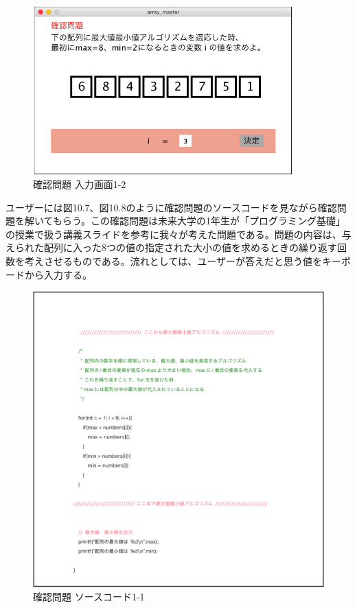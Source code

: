 \documentclass[openany,11pt,papersize]{jsbook}
\begin{document}
\begin{figure}[H]
\begin{center}
\includegraphics[width=10cm, bb=0 0 647 422]{img/9thParagraph/kakuninmondai_02.png}
\end{center}
\caption{確認問題 入力画面1-2}
\end{figure}

ユーザーには図10.7、図10.8のように確認問題のソースコードを見ながら確認問題を解いてもらう。この確認問題は未来大学の1年生が「プログラミング基礎」の授業で扱う講義スライドを参考に我々が考えた問題である。問題の内容は、与えられた配列に入った8つの値の指定された大小の値を求めるときの繰り返す回数を考えさせるものである。流れとしては、ユーザーが答えだと思う値をキーボードから入力する。

\begin{figure}[H]
\begin{center}
\includegraphics[width=14cm, bb=0 0 2549 2594]{img/9thParagraph/kakuninmondai_03.png}
\end{center}
\caption{確認問題 ソースコード1-1}
\end{figure}
\end{document}

